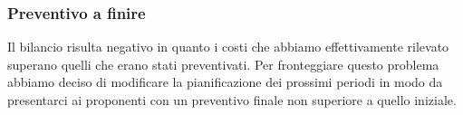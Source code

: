 		\subsubsection{Preventivo a finire}
		Il bilancio risulta negativo in quanto i costi che abbiamo effettivamente rilevato superano quelli che erano stati preventivati. Per fronteggiare questo problema abbiamo deciso di modificare la pianificazione dei prossimi periodi in modo da presentarci ai proponenti con un preventivo finale non superiore a quello iniziale. 
